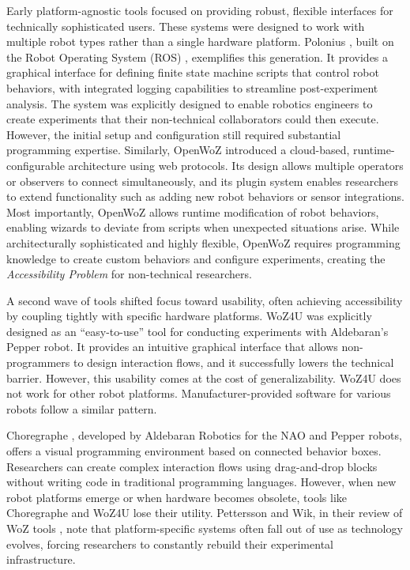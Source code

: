 Early platform-agnostic tools focused on providing robust, flexible interfaces for technically sophisticated users. These systems were designed to work with multiple robot types rather than a single hardware platform. Polonius \cite{Lu2011}, built on the Robot Operating System (ROS) \cite{Quigley2009}, exemplifies this generation. It provides a graphical interface for defining finite state machine scripts that control robot behaviors, with integrated logging capabilities to streamline post-experiment analysis. The system was explicitly designed to enable robotics engineers to create experiments that their non-technical collaborators could then execute. However, the initial setup and configuration still required substantial programming expertise. Similarly, OpenWoZ \cite{Hoffman2016} introduced a cloud-based, runtime-configurable architecture using web protocols. Its design allows multiple operators or observers to connect simultaneously, and its plugin system enables researchers to extend functionality such as adding new robot behaviors or sensor integrations. Most importantly, OpenWoZ allows runtime modification of robot behaviors, enabling wizards to deviate from scripts when unexpected situations arise. While architecturally sophisticated and highly flexible, OpenWoZ requires programming knowledge to create custom behaviors and configure experiments, creating the \emph{Accessibility Problem} for non-technical researchers.

A second wave of tools shifted focus toward usability, often achieving accessibility by coupling tightly with specific hardware platforms. WoZ4U \cite{Rietz2021} was explicitly designed as an ``easy-to-use'' tool for conducting experiments with Aldebaran's Pepper robot. It provides an intuitive graphical interface that allows non-programmers to design interaction flows, and it successfully lowers the technical barrier. However, this usability comes at the cost of generalizability. WoZ4U does not work for other robot platforms. Manufacturer-provided software for various robots follow a similar pattern.

Choregraphe \cite{Pot2009}, developed by Aldebaran Robotics for the NAO and Pepper robots, offers a visual programming environment based on connected behavior boxes. Researchers can create complex interaction flows using drag-and-drop blocks without writing code in traditional programming languages. However, when new robot platforms emerge or when hardware becomes obsolete, tools like Choregraphe and WoZ4U lose their utility. Pettersson and Wik, in their review of WoZ tools \cite{Pettersson2015}, note that platform-specific systems often fall out of use as technology evolves, forcing researchers to constantly rebuild their experimental infrastructure.

